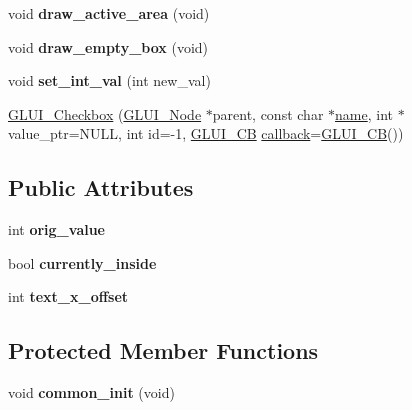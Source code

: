 \begin{DoxyCompactItemize}
\item 
\hypertarget{class_g_l_u_i___checkbox_ae6b129ff35269a2510e3c38f627d82a3}{void {\bfseries draw\+\_\+active\+\_\+area} (void)}\label{class_g_l_u_i___checkbox_ae6b129ff35269a2510e3c38f627d82a3}

\item 
\hypertarget{class_g_l_u_i___checkbox_a477ff2ccc6f25ee1e3c8e16647af3e69}{void {\bfseries draw\+\_\+empty\+\_\+box} (void)}\label{class_g_l_u_i___checkbox_a477ff2ccc6f25ee1e3c8e16647af3e69}

\item 
\hypertarget{class_g_l_u_i___checkbox_a33a217485f0a8d17d7c45de5a91f57fd}{void {\bfseries set\+\_\+int\+\_\+val} (int new\+\_\+val)}\label{class_g_l_u_i___checkbox_a33a217485f0a8d17d7c45de5a91f57fd}

\item 
\hyperlink{class_g_l_u_i___checkbox_a37dc0700283da8c9e05d57153f04e59b}{G\+L\+U\+I\+\_\+\+Checkbox} (\hyperlink{class_g_l_u_i___node}{G\+L\+U\+I\+\_\+\+Node} $\ast$parent, const char $\ast$\hyperlink{class_g_l_u_i___control_aa95b97d50df45335fc33f0af03958eb3}{name}, int $\ast$value\+\_\+ptr=N\+U\+L\+L, int id=-\/1, \hyperlink{class_g_l_u_i___c_b}{G\+L\+U\+I\+\_\+\+C\+B} \hyperlink{class_g_l_u_i___control_a96060fe0cc6d537e736dd6eef78e24ab}{callback}=\hyperlink{class_g_l_u_i___c_b}{G\+L\+U\+I\+\_\+\+C\+B}())
\end{DoxyCompactItemize}
\subsection*{Public Attributes}
\begin{DoxyCompactItemize}
\item 
\hypertarget{class_g_l_u_i___checkbox_a4b98b08b7a7aa76b9a2d11769c36afe0}{int {\bfseries orig\+\_\+value}}\label{class_g_l_u_i___checkbox_a4b98b08b7a7aa76b9a2d11769c36afe0}

\item 
\hypertarget{class_g_l_u_i___checkbox_a67719010e5421edee03a1a7c98dc34d0}{bool {\bfseries currently\+\_\+inside}}\label{class_g_l_u_i___checkbox_a67719010e5421edee03a1a7c98dc34d0}

\item 
\hypertarget{class_g_l_u_i___checkbox_ac3cec38298f8c0f6a1573070c759fcbe}{int {\bfseries text\+\_\+x\+\_\+offset}}\label{class_g_l_u_i___checkbox_ac3cec38298f8c0f6a1573070c759fcbe}

\end{DoxyCompactItemize}
\subsection*{Protected Member Functions}
\begin{DoxyCompactItemize}
\item 
\hypertarget{class_g_l_u_i___checkbox_abce9cded0f247b501c92b7037d7036e0}{void {\bfseries common\+\_\+init} (void)}\label{class_g_l_u_i___checkbox_abce9cded0f247b501c92b7037d7036e0}

\end{DoxyCompactItemize}
